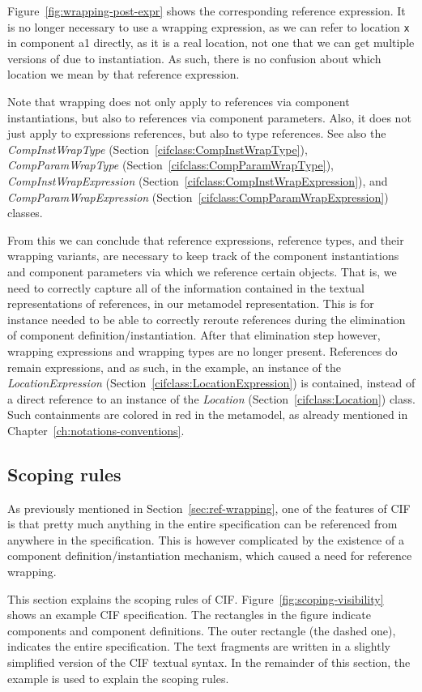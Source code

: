 \documentclass{report}
\newcommand{\cifclass}[1]{\textit{#1} (Section~\ref{cifclass:#1})}
\begin{document}
Figure~\ref{fig:wrapping-post-expr} shows the corresponding reference
expression. It is no longer necessary to use a wrapping expression, as we
can refer to location \texttt{x} in component a1 directly, as it is a real
location, not one that we can get multiple versions of due to instantiation.
As such, there is no confusion about which location we mean by that reference
expression.

Note that wrapping does not only apply to references via component
instantiations, but also to references via component parameters.
Also, it does not just apply to expressions references, but also to type
references. See also the \cifclass{CompInstWrapType},
\cifclass{CompParamWrapType}, \cifclass{CompInstWrapExpression}, and
\cifclass{CompParamWrapExpression} classes.

From this we can conclude that reference expressions, reference types, and
their wrapping variants, are necessary to keep track of the component
instantiations and component parameters via which we reference certain
objects. That is, we need to correctly capture all of the information contained
in the textual representations of references, in our metamodel representation.
This is for instance needed to be able to correctly reroute references during
the elimination of component definition/instantiation. After that elimination
step however, wrapping expressions and wrapping types are no longer present.
References do remain expressions, and as such, in the example, an instance
of the \cifclass{LocationExpression} is contained, instead of a direct
reference to an instance of the \cifclass{Location} class. Such containments
are colored in red in the metamodel, as already mentioned in
Chapter~\ref{ch:notations-conventions}.


\subsection{Scoping rules}

As previously mentioned in Section~\ref{sec:ref-wrapping}, one of the features
of CIF is that pretty much anything in the entire specification can be
referenced from anywhere in the specification. This is however complicated by
the existence of a component definition/instantiation mechanism, which caused
a need for reference wrapping.

This section explains the scoping rules of CIF.
Figure~\ref{fig:scoping-visibility} shows an example CIF specification. The
rectangles in the figure indicate components and component definitions. The
outer rectangle (the dashed one), indicates the entire specification. The
text fragments are written in a slightly simplified version of the CIF textual
syntax. In the remainder of this section, the example is used to explain
the scoping rules.
\end{document}
